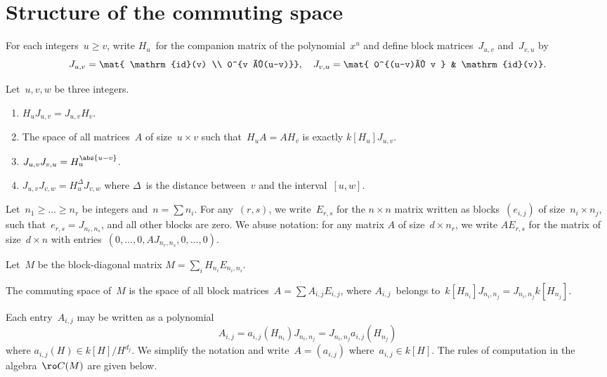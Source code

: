 \documentclass{article}
\begin{document}
\section{Structure of the commuting space}
For each integers~$u ≥ v$, write $H_u$~for the companion matrix of the
polynomial~$x^u$ and define block matrices~$J_{u,v}$ and~$J_{v,u}$ by
\begin{equation}
J_{u,v} = \mat{ \mathrm{id}(v) \\ 0^{v ×(u-v)}},\quad
J_{v,u} = \mat{ 0^{(u-v)× v } & \mathrm{id}(v)}.
\end{equation}

\begin{prop}\label{prop:rel-HJ}
Let~$u, v, w$ be three integers.
\begin{enumerate}
\item $H_{u} J_{u,v} = J_{u,v} H_{v}$.
\item The space of all matrices~$A$ of size~$u × v$ such that~$H_u A
= A H_v$ is exactly $k[H_u] J_{u,v}$.
\item $J_{u,v} J_{v,u} = H_{u}^{\abs{u-v}}$.
\item $J_{u,v} J_{v,w} = H_u^{Δ} J_{v,w}$ where $Δ$~is the distance
between~$v$ and the interval~$[u,w]$.
\end{enumerate}
\end{prop}

Let~$n_1 ≥ … ≥ n_r$ be integers and~$n = ∑ n_i$.
For any~$(r, s)$, we write~$E_{r,s}$ for the $n × n$ matrix written as
blocks~$(e_{i,j})$ of size~$n_i × n_j$, such that~$e_{r,s} = J_{n_r,
n_s}$, and all other blocks are zero. We abuse notation: for any matrix
$A$ of size~$d × n_{r}$, we write $A E_{r,s}$ for the matrix of size~$d ×
n$ with entries~$(0, …, 0, A J_{n_r,n_s}, 0, …, 0)$.

\begin{prop}\label{prop:structure-commutant}
Let~$M$ be the block-diagonal matrix $M = ∑_{i} H_{n_i} E_{n_i,n_i}$.

The commuting space of~$M$ is the space of
all block matrices~$A = ∑ A_{i,j} E_{i,j}$, where $A_{i,j}$~belongs
to~$k[H_{n_i}] J_{n_{i}, n_{j}} = J_{n_i, n_j} k[H_{n_j}]$.
\end{prop}

Each entry~$A_{i,j}$ may be written as a polynomial
\begin{equation}
A_{i,j} = a_{i,j} (H_{n_i}) J_{n_i,n_j} = J_{n_i,n_j} a_{i,j} (H_{n_j})
\end{equation}
where $a_{i,j}(H) ∈ k[H]/H^{d_j}$.
We simplify the notation and write~$A = (a_{i,j})$ where~$a_{i,j} ∈
k[H]$. The rules of computation in the algebra~$\ro C(M)$ are given
below.
\end{document}

